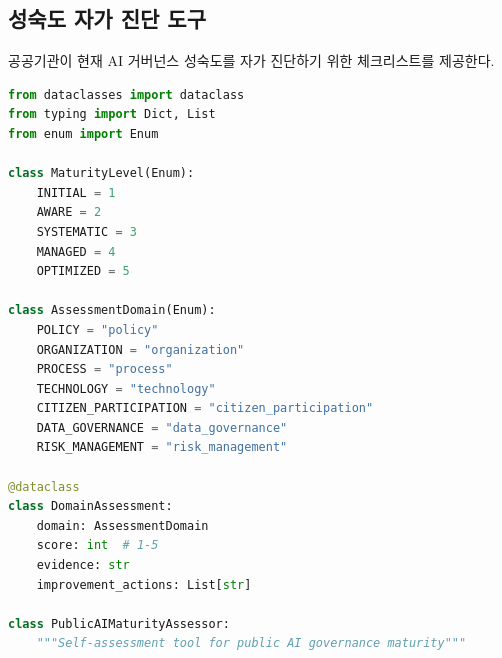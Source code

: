 \subsection{성숙도 자가 진단 도구}

공공기관이 현재 AI 거버넌스 성숙도를 자가 진단하기 위한 체크리스트를 제공한다.

\begin{lstlisting}[language=Python, caption={Public AI Governance Maturity Self-Assessment Tool}, label={lst:maturity}]
from dataclasses import dataclass
from typing import Dict, List
from enum import Enum

class MaturityLevel(Enum):
    INITIAL = 1
    AWARE = 2
    SYSTEMATIC = 3
    MANAGED = 4
    OPTIMIZED = 5

class AssessmentDomain(Enum):
    POLICY = "policy"
    ORGANIZATION = "organization"
    PROCESS = "process"
    TECHNOLOGY = "technology"
    CITIZEN_PARTICIPATION = "citizen_participation"
    DATA_GOVERNANCE = "data_governance"
    RISK_MANAGEMENT = "risk_management"

@dataclass
class DomainAssessment:
    domain: AssessmentDomain
    score: int  # 1-5
    evidence: str
    improvement_actions: List[str]

class PublicAIMaturityAssessor:
    """Self-assessment tool for public AI governance maturity"""


\end{lstlisting}
